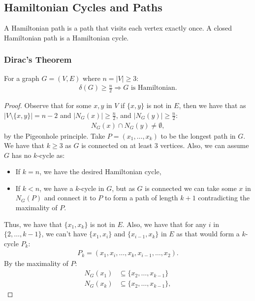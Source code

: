 \subsection{Hamiltonian Cycles and Paths}

A Hamiltonian path is a path that visits each vertex exactly once.
A closed Hamiltonian path is a Hamiltonian cycle.

\subsubsection{Dirac's Theorem}

For a graph $G = (V, E)$ where $n = |V| \geq 3$: \begin{gather*}
  \delta(G) \geq \frac{n}{2} \Rightarrow G \text{ is Hamiltonian.}
\end{gather*}
\begin{proof}
  Observe that for some $x, y$ in $V$ if $\{x, y\}$ is not in $E$,
  then we have that as $|V \setminus \{x, y\}| = n - 2$ and
  $|N_G(x)| \geq \frac{n}{2}$, and $|N_G(y)| \geq \frac{n}{2}$: 
  \begin{gather*}
      N_G(x) \cap N_G(y) \neq \emptyset,
  \end{gather*} by the Pigeonhole principle. Take $P = (x_1, \ldots, x_k)$
  to be the longest path in $G$. We have that $k \geq 3$ as $G$ is
  connected on at least 3 vertices. Also, we can assume $G$ has no
  $k$-cycle as: \begin{itemize}
      \item If $k = n$, we have the desired Hamiltonian cycle,
      \item If $k < n$, we have a $k$-cycle in $G$, but as $G$ is connected
      we can take some $x$ in $N_G(P)$ and connect it to $P$ to form
      a path of length $k + 1$ contradicting the maximality of $P$. 
  \end{itemize} Thus, we have that $\{x_1, x_k\}$ is not in $E$.
  Also, we have that for any $i$ in $\{2, \ldots, k - 1\}$, we can't
  have $\{x_1, x_i\}$ and $\{x_{i - 1}, x_k\}$ in $E$ as that would form
  a $k$-cycle $P_k$: \begin{gather} \label{consecneighbours}
      P_k = (x_1, x_i, \ldots, x_k, x_{i - 1}, \ldots, x_2).
  \end{gather} By the maximality of $P$: 
  \begin{equation*}   
      \begin{aligned}
          N_G(x_1) &\subseteq \{x_2, \ldots, x_{k - 1}\} \\
          N_G(x_k) &\subseteq \{x_2, \ldots, x_{k - 1}\},

\end{aligned}
\end{equation*}
\end{proof}
